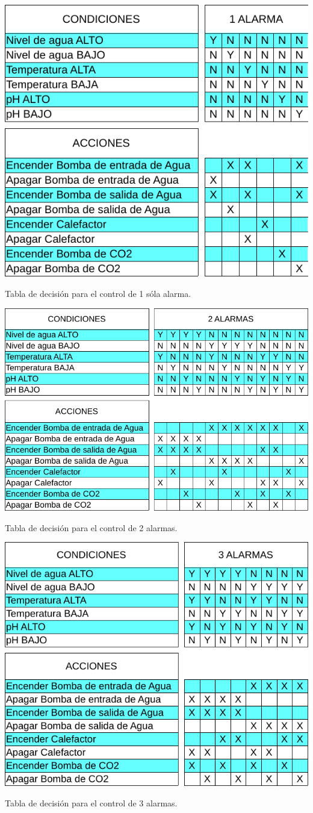\begin{table}[ht!]
	\centering
    \includegraphics[width=.7\textwidth]{./Figures/tabla1alarma.pdf}
	\caption{Tabla de decisión para el control de 1 sóla alarma.}
	\label{tab:1alarma}
\end{table}

\begin{table}[ht!]
	\centering
    \includegraphics[width=.9\textwidth]{./Figures/tabla2alarmas.pdf}
	\caption{Tabla de decisión para el control de 2 alarmas.}
	\label{tab:2alarmas}
\end{table}

\begin{table}[ht!]
	\centering
    \includegraphics[width=.8\textwidth]{./Figures/tabla3alarmas.pdf}
	\caption{Tabla de decisión para el control de 3 alarmas.}
	\label{tab:3alarmas}
\end{table}

